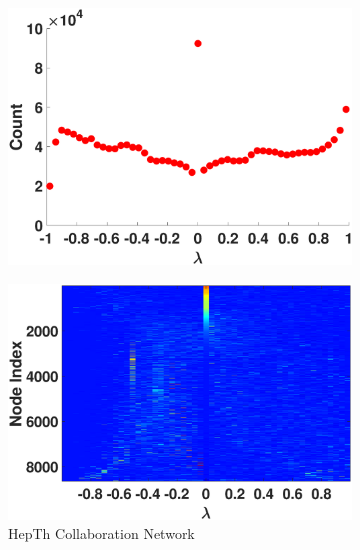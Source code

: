 \begin{figure}[htp]
\begin{subfigure}[t]{0.19\textwidth}
    \includegraphics[width=\textwidth,trim = .4cm 0.5cm 3.5cm .3cm,clip]
    {./ndos/pics/roadca}
    \label{fig:roadca_dos}
  \end{subfigure}
  \begin{subfigure}[t]{0.19\textwidth}
    \centering  
    \captionsetup{justification=centering,font=scriptsize}
    \includegraphics[width=\textwidth,trim = .4cm 0.5cm 3.5cm 1.3cm,clip]
    {./ndos/pics/hepth_ldos}
    \caption{HepTh Collaboration Network}
    \label{fig:hepth_ldos}
  \end{subfigure}
  \begin{subfigure}[t]{0.19\textwidth}
    \centering  
    \captionsetup{justification=centering,font=scriptsize}

\end{subfigure}
\end{figure}
